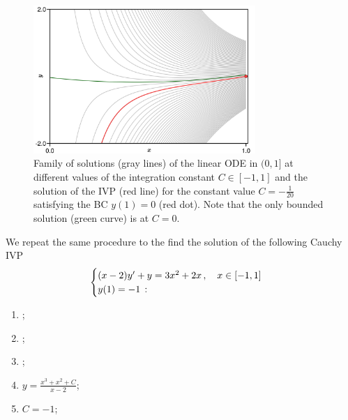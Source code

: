 \documentclass[../main.tex]{subfiles}
\begin{document}
\begin{example_continued}
     \begin{figure}[H]
         \centering 
         \includegraphics[keepaspectratio, width=0.75\textwidth]{../figures/figure1.2.0.0.png}
         \caption{Family of solutions (gray lines) of the linear ODE in $(0,1]$ at different values of the integration constant $C\in[-1,1]$ and the solution of the IVP (red line) for the constant value $C=-\frac{1}{20}$ satisfying the BC $y(1)=0$ (red dot).
         Note that the only bounded solution (green curve) is at $C=0$.}
         \label{fig1.2.0.0}
     \end{figure}
\end{example_continued}
\begin{example}[label=ex1.2.0.1]{}{}
     We repeat the same procedure to the find the solution of the following Cauchy IVP
     \begin{equation*}
        \begin{cases}
            (x-2)y' + y = 3x^{2} +2x \,, \quad x\in[-1,1]\\
            y(1) = -1\,: 
        \end{cases}
     \end{equation*}
\end{example}
\begin{example_continued}
    \begin{enumerate}
            \item ;
            \item ;
            \item ;
            \item $y=\frac{x^{3}+x^{2}+C}{x-2}$;
            \item $C = -1$;
    \end{enumerate} 
\end{example_continued}
\end{document}
